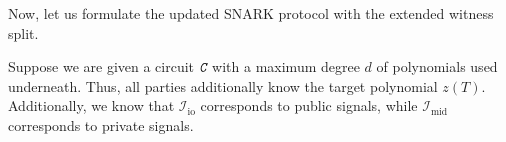 \documentclass[../../book.tex]{subfiles}
\begin{document}
Now, let us formulate the updated SNARK protocol with the extended witness split.

\begin{tcolorbox}[title=Attempt \#4: Sound SNARK for Public/Private Inputs,
    breakable,
    colback=blue!5!white,
    colframe=blue!75!black,
    colbacktitle=blue!25!white,
    coltitle=blue!20!black,
    fonttitle=\bfseries,
    boxrule=1.25pt,
    subtitle style={boxrule=0pt,
    colback=blue!20!white,
    colupper=blue!75!gray} ]

    Suppose we are given a circuit $\textit{\texttt{C}}$ with a maximum degree $d$ of polynomials used underneath. Thus, all parties additionally know the target polynomial $z(T)$. \textcolor{green!50!black}{Additionally, we know that $\mathcal{I}_{\text{io}}$ corresponds to public signals, while $\mathcal{I}_{\text{mid}}$ corresponds to private signals.}


\end{tcolorbox}
\end{document}
